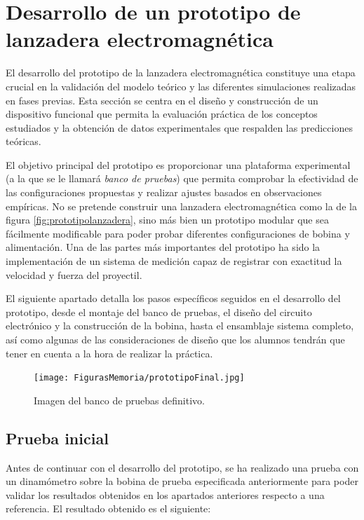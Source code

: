 \section{Desarrollo de un prototipo de lanzadera electromagnética}
\label{sec:prototipo}

El desarrollo del prototipo de la lanzadera electromagnética constituye una etapa crucial en la validación del modelo teórico y las diferentes simulaciones realizadas en fases previas. Esta sección se centra en el diseño y construcción de un dispositivo funcional que permita la evaluación práctica de los conceptos estudiados y la obtención de datos experimentales que respalden las predicciones teóricas.

El objetivo principal del prototipo es proporcionar una plataforma experimental (a la que se le llamará \textit{banco de pruebas}) que permita comprobar la efectividad de las configuraciones propuestas y realizar ajustes basados en observaciones empíricas. No se pretende construir una lanzadera electromagnética como la de la figura \ref{fig:prototipolanzadera}, sino más bien un prototipo modular que sea fácilmente modificable para poder probar diferentes configuraciones de bobina y alimentación. Una de las partes más importantes del prototipo ha sido la implementación de un sistema de medición capaz de registrar con exactitud la velocidad y fuerza del proyectil.

El siguiente apartado detalla los pasos específicos seguidos en el desarrollo del prototipo, desde el montaje del banco de pruebas, el diseño del circuito electrónico y la construcción de la bobina, hasta el ensamblaje sistema completo, así como algunas de las consideraciones de diseño que los alumnos tendrán que tener en cuenta a la hora de realizar la práctica.

\begin{figure}[H]
    \centering
    \texttt{[image: FigurasMemoria/prototipoFinal.jpg]}
    \caption{Imagen del banco de pruebas definitivo.}
    \label{fig:prototipoFinal} %
\end{figure}

\newpage

\subsection{Prueba inicial}

Antes de continuar con el desarrollo del prototipo, se ha realizado una prueba con un dinamómetro sobre la bobina de prueba especificada anteriormente para poder validar los resultados obtenidos en los apartados anteriores respecto a una referencia. El resultado obtenido es el siguiente:

